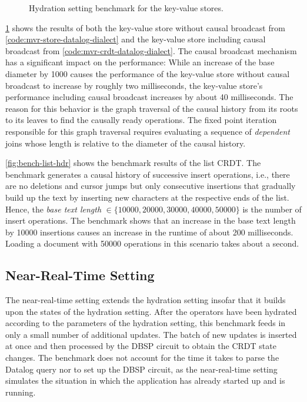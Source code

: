 \begin{figure}[bt]
    \centering
    
    \caption{
        Hydration setting benchmark for the key-value stores.
    }\label{fig:hydration-kv-store}
\end{figure}

\ref{fig:hydration-kv-store} shows the results of both the key-value store
without causal broadcast from \ref{code:mvr-store-datalog-dialect} and the
key-value store including causal broadcast from \ref{code:mvr-crdt-datalog-dialect}.
The causal broadcast mechanism has a significant impact on the performance:
While an increase of the base diameter by 1000 causes the performance of the
key-value store without causal broadcast to increase by roughly two milliseconds,
the key-value store's performance including causal broadcast increases by about
40 milliseconds.
The reason for this behavior is the graph traversal of the causal history from its
roots to its leaves to find the causally ready operations.
The fixed point iteration responsible for this graph traversal requires evaluating
a sequence of \emph{dependent} joins whose length is relative to the diameter
of the causal history.



\ref{fig:bench-list-hdr} shows the benchmark results of the list \ac{CRDT}.
The benchmark generates a causal history of successive insert operations, i.e.,
there are no deletions and cursor jumps but only consecutive insertions that
gradually build up the text by inserting new characters at the respective ends
of the list.
Hence, the \emph{base text length} \(\in \{10000, 20000, 30000, 40000, 50000\}\)
is the number of insert operations.
The benchmark shows that an increase in the base text length by 10000 insertions
causes an increase in the runtime of about 200 milliseconds.
Loading a document with 50000 operations in this scenario takes about a second.

\subsection{Near-Real-Time Setting}\label{sec:bench-nrt}

The near-real-time setting extends the hydration setting insofar that it builds
upon the states of the hydration setting.
After the operators have been hydrated according to the parameters of the
hydration setting, this benchmark feeds in only a small number of additional updates.
The batch of new updates is inserted at once and then processed by the DBSP circuit
to obtain the \ac{CRDT} state changes.
The benchmark does not account for the time it takes to parse the Datalog query
nor to set up the DBSP circuit, as the near-real-time setting simulates
the situation in which the application has already started up and is running.

